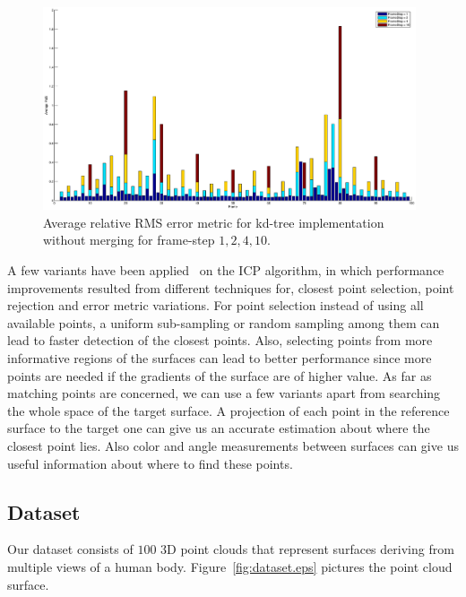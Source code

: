 \begin{figure}[ht!]
  \centering
    \includegraphics[width=0.98\textwidth]{figures/RMSunmergedKD.eps}
    \caption{Average relative RMS error metric for kd-tree implementation without merging for frame-step $1,2,4,10$.}
    \label{fig:rmsunmergederror}
\end{figure}

A few variants have been applied~\cite{icpVar} on the ICP algorithm, in which performance improvements resulted from different techniques for, closest point selection, point rejection and error metric variations. For point selection instead of using all available points, a uniform sub-sampling or random sampling among them can lead to faster detection of the closest points. Also, selecting points from more informative regions of the surfaces can lead to better performance since more points are needed if the gradients of the surface are of higher value. As far as matching points are concerned, we can use a few variants apart from searching the whole space of the target surface. A projection of each point in the reference surface to the target one can give us an accurate estimation about where the closest point lies. Also color and angle measurements between surfaces can give us useful information about where to find these points.

\subsection{Dataset}
Our dataset consists of $100$ 3D point clouds that represent surfaces deriving from multiple views of a human body. Figure~\ref{fig:dataset.eps} pictures the point cloud surface.



